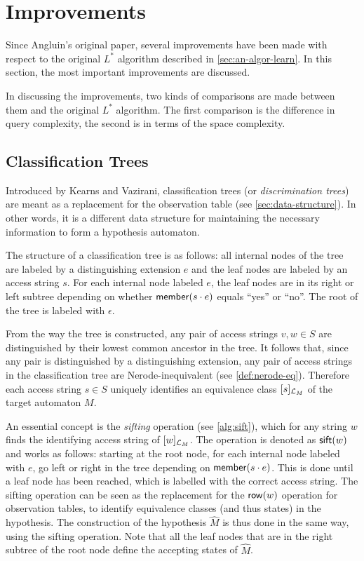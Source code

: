 \documentclass[multi,crop=false,class=article]{standalone}
\begin{document}
\section{Improvements}
\label{sec:improvements}
Since Angluin's original paper, several improvements have been made with respect
to the original $L^*$ algorithm described in \cref{sec:an-algor-learn}. In this
section, the most important improvements are discussed.

In discussing the improvements, two kinds of comparisons are made between them
and the original $L^*$ algorithm. The first comparison is the difference in
query complexity, the second is in terms of the space complexity.

\subsection{Classification Trees}
\label{sec:classification-trees}
Introduced by Kearns and Vazirani\cite{Kearns1994}, classification trees (or
\textit{discrimination trees}) are meant as a replacement for the observation
table (see \cref{sec:data-structure}). In other words, it is a different data
structure for maintaining the necessary information to form a hypothesis
automaton.

The structure of a classification tree is as follows: all internal nodes of the
tree are labeled by a distinguishing extension $e$ and the leaf nodes are
labeled by an access string $s$. For each internal node labeled $e$, the leaf
nodes are in its right or left subtree depending on whether $\mathsf{member}(s\cdot e)$
equals ``yes'' or ``no''. The root of the tree is labeled with $\epsilon$.

From the way the tree is constructed, any pair of access strings $v,w \in S$ are
distinguished by their lowest common ancestor in the tree. It follows that,
since any pair is distinguished by a distinguishing extension, any pair of
access strings in the classification tree are Nerode-inequivalent (see
\cref{def:nerode-eq}). Therefore each access string $s \in S$ uniquely
identifies an equivalence class $[s]_{\mathcal{L}_M}$ of the target automaton
$M$.

An essential concept is the \textit{sifting} operation (see \cref{alg:sift}),
which for any string $w$ finds the identifying access string of
$[w]_{\mathcal{L}_M}$. The operation is denoted as $\mathsf{sift}(w)$ and works as
follows: starting at the root node, for each internal node labeled with $e$, go
left or right in the tree depending on $\mathsf{member}(s \cdot e)$. This is done until a
leaf node has been reached, which is labelled with the correct access
string. The sifting operation can be seen as the replacement for the $\mathsf{row}(w)$
operation for observation tables, to identify equivalence classes (and thus
states) in the hypothesis. The construction of the hypothesis $\hat M$ is thus
done in the same way, using the sifting operation. Note that all the leaf nodes
that are in the right subtree of the root node define the accepting states of
$\hat M$.
\end{document}
